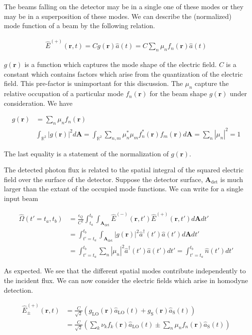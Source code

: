 \documentclass[12pt]{article}
\newcommand{\bv}[1]{\boldsymbol{#1}}
\begin{document}
The beams falling on the detector may be in a single one of these modes or they may be in a superposition of these modes. We can describe the (normalized) mode function of a beam by the following relation.

\begin{align}
\hat{E}^{(+)}(\bv{r},t) = C g(\bv{r})\hat{a}(t) = C \sum_{n} \mu_n f_n(\bv{r}) \hat{a}(t)	
\end{align}

$g(\bv{r})$ is a function which captures the mode shape of the electric field. $C$ is a constant which contains factors which arise from the quantization of the electric field. This pre-factor is unimportant for this discussion. The $\mu_n$ capture the relative occupation of a particular mode $f_n(\bv{r})$ for the beam shape $g(\bv{r})$ under consideration. We have

\begin{align}
g(\bv{r}) &= \sum_n \mu_n f_n(\bv{r})\\
& \int_{\mathbb{R}^2} |g(\bv{r})|^2 d\bv{A} = \int_{\mathbb{R}^2} \sum_{n,m} \mu_n^* \mu_m f_n^*(\bv{r})f_m(\bv{r})d\bv{A} = \sum_n |\mu_n|^2 = 1
\end{align}

The last equality is a statement of the normalization of $g(\bv{r})$.

The detected photon flux is related to the spatial integral of the squared electric field over the surface of the detector. Suppose the detector surface, $\bv{A}_{\text{det}}$ is much larger than the extant of the occupied mode functions. We can write for a single input beam

\begin{align}
\hat{\Omega}(t'=t_a,t_b) &= \frac{\epsilon_Q}{C^2} \int_{t_a}^{t_b} \int_{\bv{A}_{\text{det}}} \hat{E}^{(-)}(\bv{r},t')\hat{E}^{(+)}(\bv{r},t') d\bv{A} dt'\\
&= \int_{t'=t_a}^{t_b} \int_{\bv{A}_{\text{det}}} |g(\bv{r})|^2 \hat{a}^{\dag}(t')\hat{a}(t') d\bv{A} dt'\\
&= \int_{t'=t_a}^{t_b} \sum_n |\mu_n|^2 \hat{a}^{\dag}(t') \hat{a}(t') dt' = \int_{t'=t_a}^{t_b} \hat{n}(t') dt'
\end{align}

As expected. We see that the different spatial modes contribute independently to the incident flux. We can now consider the electric fields which arise in homodyne detection.

\begin{align}
\label{photonmodes}
\hat{E}^{(+)}_{\pm}(\bv{r},t) &= \frac{C}{\sqrt{2}}\left( g_{\text{LO}}(\bv{r}) \hat{a}_{\text{LO}}(t) + g_{\text{S}}(\bv{r}) \hat{a}_{\text{S}}(t)\right)\\
 &=\frac{C}{\sqrt{2}}\left(\sum_{k} \nu_k f_k(\bv{r}) \hat{a}_{\text{LO}}(t) \pm \sum_n \mu_n f_n(\bv{r}) \hat{a}_{\text{S}}(t) \right)
\end{align}
\end{document}
